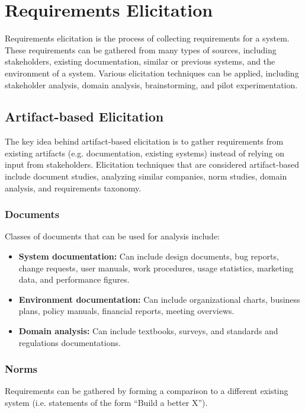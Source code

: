 \documentclass[12pt,titlepage]{article}
\begin{document}
  \newpage

  \section{Requirements Elicitation}
    Requirements elicitation is the process of collecting requirements for a system. These requirements can be gathered from many types of sources,
    including stakeholders, existing documentation, similar or previous systems, and the environment of a system. Various elicitation techniques
    can be applied, including stakeholder analysis, domain analysis, brainstorming, and pilot experimentation.

    \subsection{Artifact-based Elicitation}
      The key idea behind artifact-based elicitation is to gather requirements from existing artifacts (e.g. documentation, existing systems)
      instead of relying on input from stakeholders. Elicitation techniques that are considered artifact-based include
      document studies, analyzing similar companies, norm studies, domain analysis, and requirements taxonomy.

      \subsubsection{Documents}
        Classes of documents that can be used for analysis include:
        \begin{itemize}
          \item \textbf{System documentation:} Can include design documents, bug reports, change requests, user manuals, work procedures, usage statistics,
          marketing data, and performance figures.
          \item \textbf{Environment documentation:} Can include organizational charts, business plans, policy manuals, financial reports, meeting overviews.
          \item \textbf{Domain analysis:} Can include textbooks, surveys, and standards and regulations documentations.
        \end{itemize}

      \subsubsection{Norms}
        Requirements can be gathered by forming a comparison to a different existing system (i.e. statements of the form ``Build a better X'').
\end{document}
